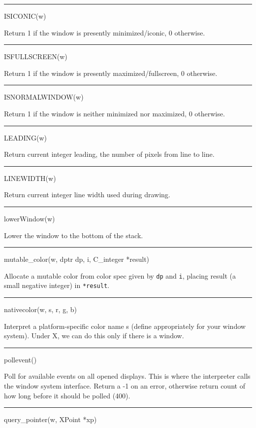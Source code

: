 \bigskip\hrule\vspace{0.1cm}
\noindent
ISICONIC(w)


Return 1 if the window is presently minimized/iconic, 0 otherwise.


\bigskip\hrule\vspace{0.1cm}
\noindent
ISFULLSCREEN(w)


Return 1 if the window is presently maximized/fullscreen, 0 otherwise.


\bigskip\hrule\vspace{0.1cm}
\noindent
ISNORMALWINDOW(w)


Return 1 if the window is neither minimized nor maximized, 0 otherwise.


\bigskip\hrule\vspace{0.1cm}
\noindent
LEADING(w)


Return current integer leading, the number of pixels from line to line.


\bigskip\hrule\vspace{0.1cm}
\noindent
LINEWIDTH(w)


Return current integer line width used during drawing.


\bigskip\hrule\vspace{0.1cm}
\noindent
lowerWindow(w)


Lower the window to the bottom of the stack.


\bigskip\hrule\vspace{0.1cm}
\noindent
mutable\_color(w, dptr dp, i, C\_integer *result)


Allocate a mutable color from color spec given by \texttt{dp} and
\texttt{i}, placing result (a small negative integer) in
\texttt{*result}.


\bigskip\hrule\vspace{0.1cm}
\noindent
nativecolor(w, s, r, g, b)


Interpret a platform-specific color name s (define appropriately for
your window system). Under X, we can do this only if there is a
window.


\bigskip\hrule\vspace{0.1cm}
\noindent
pollevent()


Poll for available events on all opened displays. This is where the
interpreter calls the window system interface. Return a -1 on an
error, otherwise return count of how long before it should be polled
(400).


\bigskip\hrule\vspace{0.1cm}
\noindent
query\_pointer(w, XPoint *xp)


